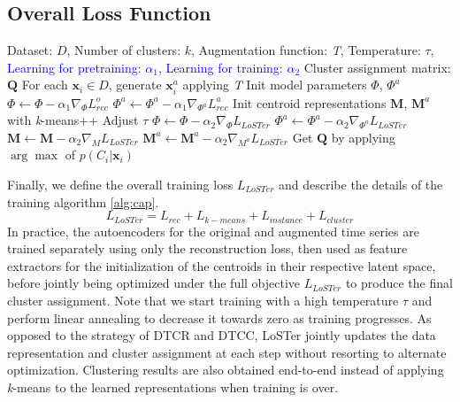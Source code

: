 \documentclass[times, review, 10pt]{elsarticle}
\begin{document}
\subsection{Overall Loss Function}
\begin{algorithm}
\caption{LoSTer Training Method}\label{alg:cap}
\begin{algorithmic}
 Dataset: $D$, Number of clusters: $k$, Augmentation function: \textit{T}, Temperature: $\tau$, \textcolor{blue}{Learning  for pretraining: $\alpha_1$, Learning  for training: $\alpha_2$}
 Cluster assignment matrix: $\mathbf{Q}$
\STATE For each $\mathbf{x}_i \in D$, generate $\mathbf{x}_i^a$ applying \textit{T}
\STATE Init model parameters $\Phi$, $\Phi^a$
\STATE $\Phi \gets \Phi - \alpha_1 \nabla_{\Phi} L_{rec}^o$
\ENDWHILE
{}
\STATE $\Phi^a \gets \Phi^a - \alpha_1 \nabla_{\Phi^a} L_{rec}^a$
\ENDWHILE
\STATE Init centroid representations $\mathbf{M}$, $\mathbf{M}^a$ with \textit{k}-means++
\STATE Adjust $\tau$
\STATE $\Phi \gets \Phi - \alpha_2 \nabla_{\Phi} L_{LoSTer}$
\STATE $\Phi^a \gets \Phi^a - \alpha_2 \nabla_{\Phi^a} L_{LoSTer}$
\STATE $\mathbf{M} \gets \mathbf{M} - \alpha_2 \nabla_{M} L_{LoSTer}$
\STATE $\mathbf{M}^a \gets \mathbf{M}^a - \alpha_2 \nabla_{M^a} L_{LoSTer}$
\ENDWHILE
\STATE Get $\mathbf{Q}$ by applying $\arg \max$ of $p(C_i | \mathbf{x}_i)$
\end{algorithmic}
\end{algorithm}
%
Finally, we define the overall training loss $L_{LoSTer}$ and describe the details of the training algorithm \ref{alg:cap}.
%
\begin{equation}
    L_{LoSTer} = L_{rec} + L_{k-means} + L_{instance} + L_{cluster}
\end{equation}
%
In practice, the autoencoders for the original and augmented time series are trained separately using only the reconstruction loss, then used as feature extractors for the initialization of the centroids in their respective latent space, before jointly being optimized under the full objective $L_{LoSTer}$ to produce the final cluster assignment. Note that we start training with a high temperature $\tau$ and perform linear annealing to decrease it towards zero as training progresses. As opposed to the strategy of DTCR and DTCC, LoSTer jointly updates the data representation and cluster assignment at each step without resorting to alternate optimization. Clustering results are also obtained end-to-end instead of applying \textit{k}-means to the learned representations when training is over.
\end{document}
